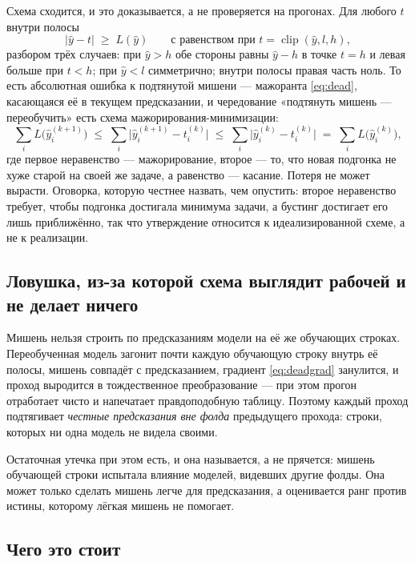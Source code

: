 Схема сходится, и это доказывается, а не проверяется на прогонах. Для любого $t$ внутри полосы
\begin{equation}
|\hat y - t| \;\ge\; L(\hat y)
\qquad\text{с равенством при } t = \operatorname{clip}(\hat y, l, h),
\label{eq:major}
\end{equation}
разбором трёх случаев: при $\hat y > h$ обе стороны равны $\hat y - h$ в точке $t = h$ и левая
больше при $t < h$; при $\hat y < l$ симметрично; внутри полосы правая часть ноль. То есть
абсолютная ошибка к подтянутой мишени --- мажоранта \eqref{eq:dead}, касающаяся её в текущем
предсказании, и чередование «подтянуть мишень --- переобучить» есть схема мажорирования-минимизации:
\[
\textstyle\sum_i L\bigl(\hat y^{(k+1)}_i\bigr)
\;\le\; \sum_i \bigl|\hat y^{(k+1)}_i - t^{(k)}_i\bigr|
\;\le\; \sum_i \bigl|\hat y^{(k)}_i - t^{(k)}_i\bigr|
\;=\; \sum_i L\bigl(\hat y^{(k)}_i\bigr),
\]
где первое неравенство --- мажорирование, второе --- то, что новая подгонка не хуже старой на своей
же задаче, а равенство --- касание. Потеря не может вырасти. Оговорка, которую честнее назвать, чем
опустить: второе неравенство требует, чтобы подгонка достигала минимума задачи, а бустинг достигает
его лишь приближённо, так что утверждение относится к идеализированной схеме, а не к реализации.

\subsection{Ловушка, из-за которой схема выглядит рабочей и не делает ничего}

Мишень нельзя строить по предсказаниям модели на её же обучающих строках. Переобученная модель
загонит почти каждую обучающую строку внутрь её полосы, мишень совпадёт с предсказанием, градиент
\eqref{eq:deadgrad} занулится, и проход выродится в тождественное преобразование --- при этом прогон
отработает чисто и напечатает правдоподобную таблицу. Поэтому каждый проход подтягивает
\emph{честные предсказания вне фолда} предыдущего прохода: строки, которых ни одна модель не видела
своими.

Остаточная утечка при этом есть, и она называется, а не прячется: мишень обучающей строки испытала
влияние моделей, видевших другие фолды. Она может только сделать мишень легче для предсказания, а
оценивается ранг против истины, которому лёгкая мишень не помогает.

\subsection{Чего это стоит}


